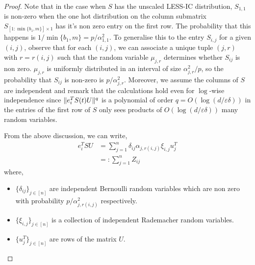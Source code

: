\documentclass[11pt]{amsart}
\numberwithin{equation}{section}
\numberwithin{equation}{section}
\DeclarePairedDelimiter{\norm}{\lVert}{\rVert}
\theoremstyle{remark}
\theoremstyle{definition}
\begin{document}
\begin{proof}
Note that in the case when $S$ has the unscaled LESS-IC distribution, $S_{1,1}$ is non-zero when the one hot distribution on the column submatrix $S_{[1:\min \{b_1, m \}]\times{1}}$ has it's non zero entry on the first row. The probability that this happens is $1/\min \{b_1, m \} = p/\alpha_{1,1}^2$. To generalise this to the entry $S_{i,j}$ for a given $(i,j)$, observe that for each $(i,j)$, we can associate a unique tuple $(j,r)$ with $r=r(i,j)$ such that the random variable $\mu_{j,r}$ determines whether $S_{ij}$ is non zero. $\mu_{j,r}$ is uniformly distributed in an interval of size $\alpha^2_{j,r}/p$, so the probability that $S_{ij}$ is non-zero is $p/\alpha^2_{j,r}$. Moreover, we assume the columns of $S$ are independent and remark that the calculations hold even for $\log$-wise independence since $\norm{e_{i}^TS(t)U}^{q}$ is a polynomial of order $q = O(\log (d/\varepsilon\delta))$ in the entries of the first row of $S$ only sees products of $O(\log (d/\varepsilon\delta))$ many random variables.


From the above discussion, we can write,
\begin{align*}
    e_{i}^TSU &= \sum_{j=1}^n \delta_{ij} \alpha_{j,r(i,j)} \xi_{i,j} u_j^T \\
    &=: \sum_{j=1}^n Z_{ij}
\end{align*}
where,
\begin{itemize}
    \item $\{ \delta_{ij} \}_{j \in [n]}$ are independent Bernoulli random variables which are non zero with probability $p/\alpha^2_{j,r(i,j)}$ respectively.
    \item $\{ \xi_{i,j} \}_{j \in [n]}$ is a collection of independent Rademacher random variables.
    \item $\{ u_j^T \}_{j \in [n]}$ are rows of the matrix $U$.
\end{itemize}


\end{proof}
\end{document}
